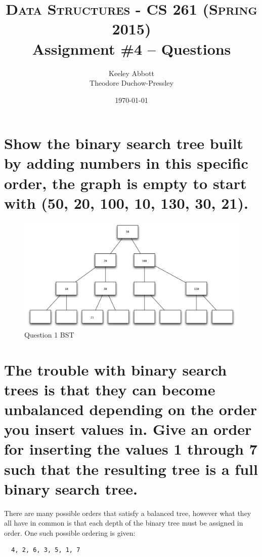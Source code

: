 \documentclass[letter,11pt]{scrartcl}
\title{
  \normalfont \normalsize
  \textsc{Data Structures - CS 261 (Spring 2015)} \\
  \huge Assignment \#4 -- Questions
}
\author{Keeley Abbott
\\ Theodore Duchow-Pressley}
\date{\normalsize\today}
\begin{document}
\maketitle


\section{Show the binary search tree built by adding numbers in this
  specific order, the graph is empty to start with (50, 20, 100, 10, 130, 30,
  21).}

\begin{figure}[H]
  \centering
  \includegraphics[width=1.0\textwidth]{bst_1}
  \caption{Question 1 BST}
\end{figure}


\section{The trouble with binary search trees is that they can become
  unbalanced depending on the order you insert values in. Give an order for
  inserting the values 1 through 7 such that the resulting tree is a full
  binary search tree.}

There are many possible orders that satisfy a balanced tree, however what they
all have in common is that each depth of the binary tree must be assigned in
order. One such possible ordering is given:

\begin{verbatim}
  4, 2, 6, 3, 5, 1, 7
\end{verbatim}
\end{document}
